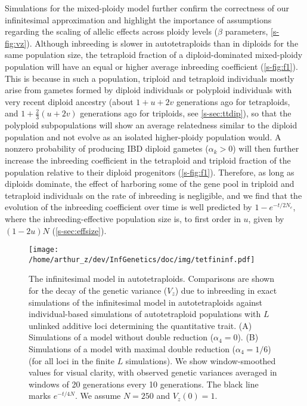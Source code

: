 \documentclass[11pt,a4paper]{article}
\begin{document}
Simulations for the mixed-ploidy model further confirm the correctness of our
infinitesimal approximation and highlight the importance of assumptions
regarding the scaling of allelic effects across ploidy levels
($\beta$ parameters, \cref{s-fig:vz}).
Although inbreeding is slower in autotetraploids than in diploids for the same
population size, the tetraploid fraction of a diploid-dominated mixed-ploidy 
population will have an equal or higher average inbreeding coefficient
(\cref{s-fig:f1}).
This is because in such a population, triploid and tetraploid individuals
mostly arise from gametes formed by diploid individuals or polyploid
individuals with very recent diploid ancestry (about $1+u+2v$ generations ago
for tetraploids, and $1+\frac{2}{3}(u+2v)$ generations ago for triploids, see
\cref{s-sec:ttdip}), so that the polyploid subpopulations will show an average
relatedness similar to the diploid population and not evolve as an isolated
higher-ploidy population would.
A nonzero probability of producing IBD diploid gametes ($\alpha_k > 0$) will
then further increase the inbreeding coefficient in the tetraploid and triploid
fraction of the population relative to their diploid progenitors
(\cref{s-fig:f1}).
Therefore, as long as diploids dominate, the effect of harboring some of the
gene pool in triploid and tetraploid individuals on the rate of inbreeding is
negligible, and we find that the evolution of the inbreeding coefficient over
time is well predicted by $1-e^{-t/2N_e}$, where the inbreeding-effective
population size is, to first order in $u$, given by $(1-2u)N$
(\cref{s-sec:effsize}). 

\begin{figure}[t]
\centering
\texttt{[image: /home/arthur\_z/dev/InfGenetics/doc/img/tetfininf.pdf]}
\caption{
The infinitesimal model in autotetraploids.
Comparisons are shown for the decay of the genetic variance ($V_z$) due to
inbreeding in exact simulations of the infinitesimal model in autotetraploids
against individual-based simulations of autotetraploid populations with $L$
unlinked additive loci determining the quantitative trait. 
(A) Simulations of a model without double reduction ($\alpha_4=0$).
(B) Simulations of a model with maximal double reduction ($\alpha_4=1/6$) (for
all loci in the finite $L$ simulations).
We show window-smoothed values for visual clarity, with observed genetic
variances averaged in windows of 20 generations every 10 generations.
The black line marks $e^{-t/4N}$. 
We assume $N=250$ and $V_z(0) = 1$.
\label{fig:vztet}}
\end{figure}
\end{document}
